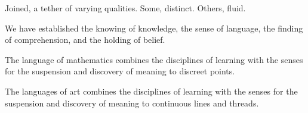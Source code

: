 Joined, a tether of varying qualities.  Some, distinct.  Others,
fluid.

\vfill
\break

We have established the knowing of knowledge, the sense of language,
the finding of comprehension, and the holding of belief.

The language of mathematics combines the disciplines of learning with
the senses for the suspension and discovery of meaning to discreet
points.

The languages of art combines the disciplines of learning with the
senses for the suspension and discovery of meaning to continuous lines
and threads.


\vfill
\bye
